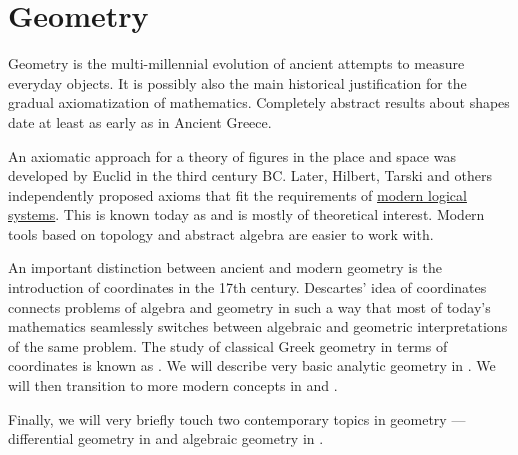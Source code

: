 \section{Geometry}\label{sec:geometry}

Geometry is the multi-millennial evolution of ancient attempts to measure everyday objects. It is possibly also the main historical justification for the gradual axiomatization of mathematics. Completely abstract results about shapes date at least as early as in Ancient Greece.

An axiomatic approach for a theory of figures in the place and space was developed by Euclid in the third century BC. Later, Hilbert, Tarski and others independently proposed axioms that fit the requirements of \hyperref[sec:mathematical_logic]{modern logical systems}. This is known today as  and is mostly of theoretical interest. Modern tools based on topology and abstract algebra are easier to work with.

An important distinction between ancient and modern geometry is the introduction of coordinates in the 17th century. Descartes' idea of coordinates connects problems of algebra and geometry in such a way that most of today's mathematics seamlessly switches between algebraic and geometric interpretations of the same problem. The study of classical Greek geometry in terms of coordinates is known as . We will describe very basic analytic geometry in . We will then transition to more modern concepts in  and .

Finally, we will very briefly touch two contemporary topics in geometry --- differential geometry in  and algebraic geometry in .
